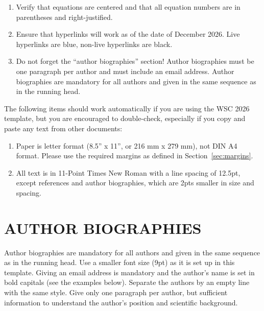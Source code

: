 \documentclass{wscpaperproc}
\theoremstyle{wsc}
\begin{document}
\begin{enumerate}
\item Verify that equations are centered and that all equation numbers are in parentheses and right-justified.
\item Ensure that hyperlinks will work as of the date of December 2026. Live hyperlinks are blue, non-live hyperlinks are black.
\item	Do not forget the ``author biographies'' section! Author biographies must be one paragraph per author and must include an email address. Author biographies are mandatory for all authors and given in the same sequence as in the running head.
\end{enumerate}

The following items should work automatically if you are using the WSC 2026 template, but you are encouraged to double-check, especially if you copy and paste any text from other documents:

\begin{enumerate}
\item Paper is letter format (8.5'' x 11'', or 216 mm x 279 mm), not DIN A4 format. Please use the required margins as defined in Section~\ref{sec:margins}.
\item All text is in 11-Point Times New Roman with a line spacing of 12.5pt, except references and author biographies, which are 2pts smaller in size and spacing.
\end{enumerate}

\footnotesize






\section*{AUTHOR BIOGRAPHIES}

{\normalsize Author biographies are mandatory for all authors and given in the same sequence as in the running head. Use a smaller font size (9pt) as it is set up in this template. Giving an email address is mandatory and the author's name is set in bold capitals (see the examples below). Separate the authors by an empty line with the same style. Give only one paragraph per author, but sufficient information to understand the author's position and scientific background.}\\
\end{document}
